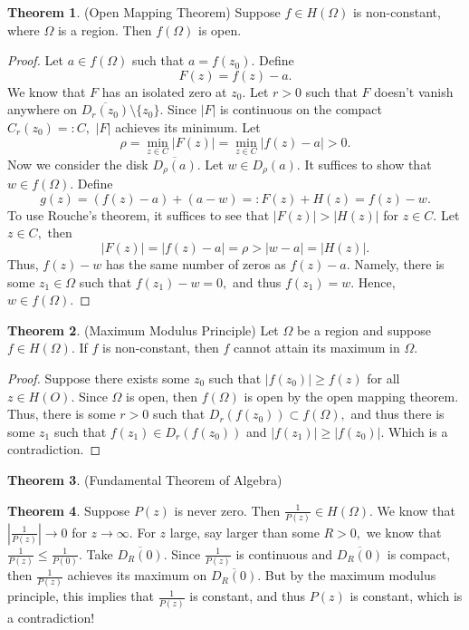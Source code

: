 \documentclass[10pt, oneside]{article}
\newcommand{\sm}{\setminus}
\theoremstyle{definition}
\newtheorem{thm}{Theorem}
\begin{document}
\begin{thm}
    (Open Mapping Theorem) Suppose $f \in H(\Omega)$ is non-constant, where $\Omega$ is a region. Then $f(\Omega)$ is open. 
\end{thm}
\begin{proof}
    Let $a \in f(\Omega)$ such that $a = f(z_0)$. Define 
    \[F(z) = f(z) -a.\] We know that $F$ has an isolated zero at $z_0.$ Let $r>0$ such that $F$ doesn't vanish anywhere on $\overline{D_r(z_0)}\sm \{z_0\}.$ Since $|F|$ is continuous on the compact $C_r(z_0)=: C,$ $|F|$ achieves its minimum. Let 
    \[\rho = \min_{z\in C}|F(z)| = \min_{z\in C}|f(z)- a|>0.\] Now we consider the disk $\overline{D_\rho(a)}.$ Let $w \in D_\rho(a).$ It suffices to show that $w\in f(\Omega).$ Define 
    \[g(z) = (f(z) - a) + (a- w) =: F(z) + H(z) = f(z)-w.\] To use Rouche's theorem, it suffices to see that $|F(z)|>|H(z)|$ for $z\in C.$ Let $z\in C,$ then 
    \[|F(z)| = |f(z) - a| = \rho > |w-a| = |H(z)|.\] Thus, $f(z) - w$ has the same number of zeros as $f(z) - a.$  Namely, there is some $z_1 \in \Omega$ such that $f(z_1) - w = 0,$ and thus $f(z_1) = w.$ Hence, $w \in f(\Omega).$
\end{proof}

\begin{thm}
    (Maximum Modulus Principle) Let $\Omega$ be a region and suppose $f\in H(\Omega).$ If $f$ is non-constant, then $f$ cannot attain its maximum in $\Omega.$
\end{thm}
\begin{proof}
    Suppose there exists some $z_0$ such that $|f(z_0)| \geq f(z)$ for all $z\in H(O).$ Since $\Omega$ is open, then $f(\Omega)$ is open by the open mapping theorem. Thus, there is some $r>0$ such that $D_r(f(z_0))\subset f(\Omega),$ and thus there is some $z_1$ such that $f(z_1) \in D_r(f(z_0))$ and $|f(z_1)| \geq |f(z_0)|.$ Which is a contradiction.
\end{proof}

\begin{thm}
    (Fundamental Theorem of Algebra)
\end{thm}

\begin{thm}
    Suppose $P(z)$ is never zero. Then $
    \frac{1}{P(z)}\in H(\Omega).$ We know that $|\frac{1}{P(z)}|\to 0$ for $z\to \infty.$ For $z$ large, say larger than some $R>0,$ we know that $\frac{1}{P(z)} \leq \frac{1}{P(0)}.$ Take $\overline{D_R(0)}.$ Since $\frac{1}{P(z)}$ is continuous and $\overline{D_R(0)}$ is compact, then $\frac{1}{P(z)}$ achieves its maximum on $\overline{D_R(0)}.$ But by the maximum modulus principle, this implies that $\frac{1}{P(z)}$ is constant, and thus $P(z)$ is constant, which is a contradiction!
\end{thm}
\end{document}
